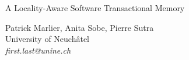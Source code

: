 \documentclass{article}
\begin{document}
\setlength{\pdfpageheight}{\paperheight}
\setlength{\pdfpagewidth}{\paperwidth}
\begin{center}
  {
    \Large 
    A Locality-Aware Software Transactional Memory
  }
  \bigskip

  Patrick Marlier, Anita Sobe, Pierre Sutra \\
  University of Neuch\^atel \\
  \emph{first.last@unine.ch}
\end{center}

\thispagestyle{empty}

\end{document}
